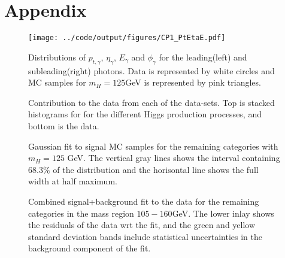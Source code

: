 \documentclass[10pt, aps, twocolumn, a4paper, nofootinbib]{revtex4}
\begin{document}
\newpage
{
\onecolumngrid
\centering
\newpage
\section{Appendix}

\begin{figure}[H]
\texttt{[image: ../code/output/figures/CP1\_PtEtaE.pdf]}
\caption{Distributions of $p_{t,\gamma}$, $\eta_{\gamma}$, $E_{\gamma}$ and $\phi_{\gamma}$ for the leading(left) and subleading(right) photons. Data is represented by white circles and MC samples for $m_H = 125$GeV is represented by pink triangles. \label{fig:PtEtaE}}
\end{figure}

\newpage

\begin{figure}[H]
\centering
{}
\caption{Contribution to the data from each of the data-sets. Top is stacked histograms for for the different Higgs production processes, and bottom is the data. \label{fig:stacked_rest}}
\end{figure}

\begin{figure}[H]
\centering
{}
\caption{Gaussian fit to signal MC samples for the remaining categories with $m_H=125$ GeV. The vertical gray lines shows the interval containing $68.3\%$ of the distribution and the horisontal line shows the full width at half maximum.\label{fig:signal_fit_rest}}
\end{figure}


\begin{figure}[H]
\centering
{}
\caption{Combined signal+background fit to the data for the remaining categories in the mass region  $105-160$GeV. The lower inlay shows the residuals of the data wrt the fit, and the green and yellow standard deviation bands include statistical uncertainties in the background component of the fit.\label{fig:s+b_fit_rest}}
\end{figure}

}
\end{document}
